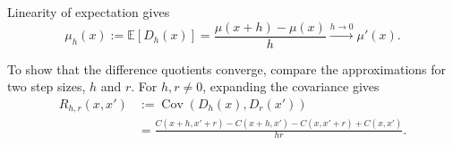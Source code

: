 \documentclass[11pt,letterpaper]{article}
\begin{document}
Linearity of expectation gives
\[
  \mu_h(x):=\mathbb E[D_h(x)]
  =\frac{\mu(x+h)-\mu(x)}h
  \xrightarrow{h\to0}\mu'(x).
\]

To show that the difference quotients converge, compare the approximations
for two step sizes, $h$ and $r$.
For $h,r\ne0$, expanding the covariance gives
\begin{align*}
  R_{h,r}(x,x')
   & :=\operatorname{Cov}(D_h(x),D_r(x'))                 \\
   & =\frac{C(x+h,x'+r)-C(x+h,x')-C(x,x'+r)+C(x,x')}{hr}.
\end{align*}
\end{document}
